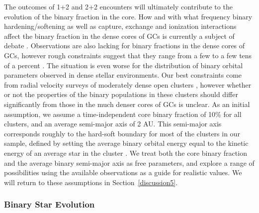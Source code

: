 The outcomes of 1+2 and 2+2 encounters will ultimately contribute to
the evolution of the binary fraction in the core.  How and with what
frequency binary 
hardening/softening as well as capture, exchange and ionization
interactions affect the binary fraction in the dense cores of GCs is
currently a subject of debate \citep[e.g.][]{ivanova05,
  hurley07}.  
Observations are also lacking for binary fractions in the dense cores of
GCs, however rough constraints suggest that they range from a few to a
few tens of a percent \citep[e.g.][]{rubenstein97, cool02, sollima08,
  davis08}.  The 
situation is even worse for the distribution of binary orbital
parameters observed in dense stellar environments.  Our best
constraints come from radial velocity surveys of moderately dense open
clusters \citep{latham05, geller09}, however whether or not the
properties of the binary populations in these clusters should differ
significantly from those in the much denser cores of GCs is unclear.
As an initial assumption, we assume a time-independent core binary
fraction of 10\% for all clusters, and an average semi-major axis
of 2 AU.  This semi-major axis corresponds roughly to the hard-soft
boundary for most of the clusters in our sample, defined by setting
the average binary orbital energy equal to the kinetic energy of an
average star in the cluster \citep[e.g.][]{heggie03}.  We 
treat both the core binary 
fraction and the average binary semi-major axis as free parameters,
and explore a range of possibilities using the available observations
as a guide for realistic values.  We will return to these assumptions 
in Section~\ref{discussion5}.

\subsubsection{Binary Star Evolution} \label{mergers5}

